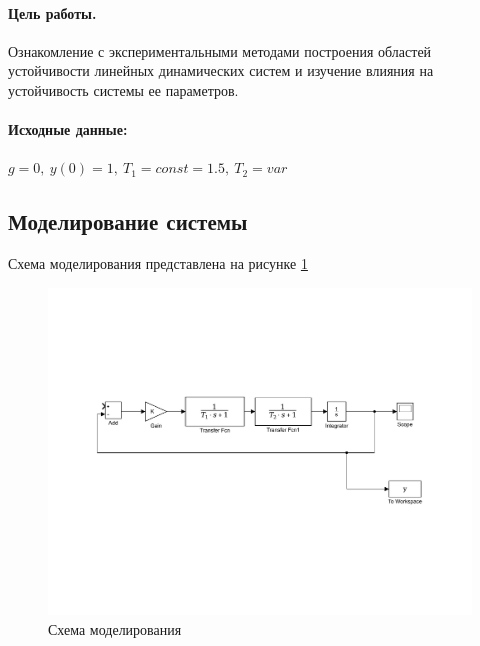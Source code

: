 \documentclass[a4paper,12pt]{article}
\begin{document}
	
	\paragraph{Цель работы.} Ознакомление с экспериментальными методами построения областей устойчивости линейных динамических систем и изучение влияния на устойчивость системы ее параметров.
	
	\paragraph {Исходные данные:} $g=0,~y(0)=1,~T_1=const=1.5,~T_2=var$\\
	\newpage
	\begin{center}
	\section{Моделирование системы}
	\end{center}
	Схема моделирования представлена на рисунке \ref{s_1}
	
	\begin{figure}[h]
		\renewcommand{\figurename}{Рисунок}
		\centering
		\includegraphics[width=6in]{Lab8MOD.pdf}
		\caption{Схема моделирования}
		\label{s_1}
	\end{figure}
	
\end{document}
